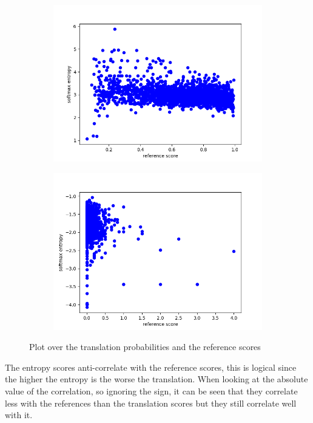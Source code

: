 \begin{figure}[ht]
\begin{subfigure}{0.4\linewidth}
        \includegraphics[width=\textwidth]{Latex/sections/images/seamlessentropy.png}
    \end{subfigure}
    \begin{subfigure}{0.4\linewidth}
        \includegraphics[width=\textwidth]{Latex/sections/images/dlmentropy.png}
    \end{subfigure}
    \caption{Plot over the translation probabilities and the reference scores}
    \label{fig:translationeval scatter plot}
\end{figure}

The entropy scores anti-correlate with the reference scores, this is logical since the higher the entropy is the worse the translation. 
When looking at the absolute value of the correlation, so ignoring the sign, it can be seen that they correlate less with the references than the translation scores but they still correlate well with it.  

